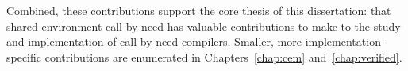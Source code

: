 Combined, these contributions support the core thesis of this dissertation: that
shared environment call-by-need has valuable contributions to make to the study
and implementation of call-by-need compilers. Smaller, more
implementation-specific contributions are enumerated in Chapters~\ref{chap:cem}
and~\ref{chap:verified}. 
